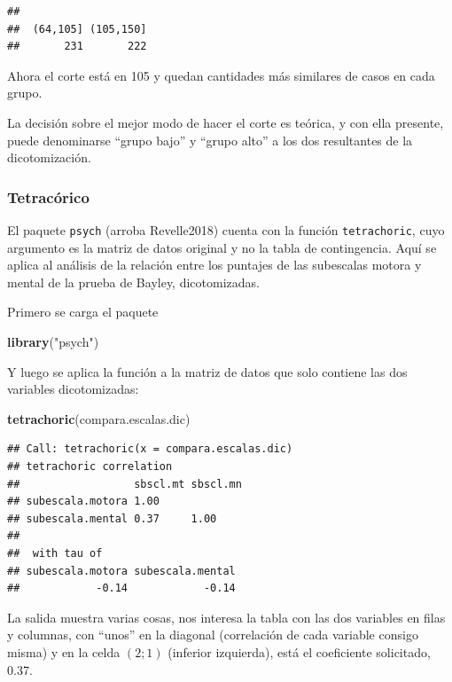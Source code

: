 \documentclass[]{book}
\newenvironment{Shaded}{\begin{snugshade}}{\end{snugshade}}
\newcommand{\KeywordTok}[1]{\textcolor[rgb]{0.13,0.29,0.53}{\textbf{#1}}}
\newcommand{\NormalTok}[1]{#1}
\newcommand{\StringTok}[1]{\textcolor[rgb]{0.31,0.60,0.02}{#1}}
\begin{document}
\begin{verbatim}
## 
##  (64,105] (105,150] 
##       231       222
\end{verbatim}

Ahora el corte está en 105 y quedan cantidades más similares de casos en cada grupo.

La decisión sobre el mejor modo de hacer el corte es teórica, y con ella presente, puede denominarse ``grupo bajo'' y ``grupo alto'' a los dos resultantes de la dicotomización.

\hypertarget{tetracuxf3rico}{%
\subsubsection{Tetracórico}\label{tetracuxf3rico}}

El paquete \texttt{psych} (arroba Revelle2018) cuenta con la función \texttt{tetrachoric}, cuyo argumento es la matriz de datos original y no la tabla de contingencia. Aquí se aplica al análisis de la relación entre los puntajes de las subescalas motora y mental de la prueba de Bayley, dicotomizadas.

Primero se carga el paquete

\begin{Shaded}
\begin{Highlighting}[]
\KeywordTok{library}\NormalTok{(}\StringTok{"psych"}\NormalTok{)}
\end{Highlighting}
\end{Shaded}

Y luego se aplica la función a la matriz de datos que solo contiene las dos variables dicotomizadas:

\begin{Shaded}
\begin{Highlighting}[]
\KeywordTok{tetrachoric}\NormalTok{(compara.escalas.dic)}
\end{Highlighting}
\end{Shaded}

\begin{verbatim}
## Call: tetrachoric(x = compara.escalas.dic)
## tetrachoric correlation 
##                  sbscl.mt sbscl.mn
## subescala.motora 1.00             
## subescala.mental 0.37     1.00    
## 
##  with tau of 
## subescala.motora subescala.mental 
##            -0.14            -0.14
\end{verbatim}

La salida muestra varias cosas, nos interesa la tabla con las dos variables en filas y columnas, con ``unos'' en la diagonal (correlación de cada variable consigo misma) y en la celda \((2; 1)\) (inferior izquierda), está el coeficiente solicitado, 0.37.
\end{document}
